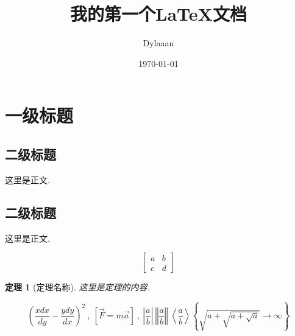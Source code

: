 \documentclass[12pt, a4paper, oneside]{ctexart}
\title{我的第一个\LaTeX 文档}
\author{Dylaaan}
\date{\today}
\newtheorem{theorem}{定理}[section]
\begin{document}
\maketitle

\tableofcontents

\section{一级标题}

\subsection{二级标题}

这里是正文.

\subsection{二级标题}

这里是正文.

$$
    \begin{bmatrix}
        a & b \\
        c & d
    \end{bmatrix}
$$
\begin{theorem}[定理名称]
    这里是定理的内容.
\end{theorem}

\begin{equation*}
    \left(\frac{xdx}{dy} -\frac{ydy}{dx}\right)^{2} \ ,\ [\vec{F} =m\vec{a}] \ ,\ \left| \frac{a}{b}\right| \ \left\Vert \frac{a}{b}\right\Vert \ \left< \frac{a}{b}\right> \left\{\sqrt{a+\sqrt{a+\sqrt{a}}}\rightarrow \infty \right\}
\end{equation*}
\end{document}
